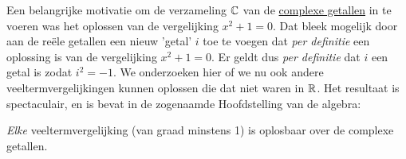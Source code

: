 \documentclass{ximera}
\begin{document}
	\author{Zomercursus KU Leuven}
	
	\label{xim:complexe_getallen_vergelijkingen}
    
Een belangrijke motivatie om de verzameling $\mathbb{C}$ van de \hyperref[xim:complexe_getallen]{complexe getallen} in te voeren was het oplossen van de vergelijking $x^2+1=0$. Dat bleek mogelijk door aan de reële getallen een nieuw 'getal' $i$ toe te voegen dat \textit{per definitie} een oplossing is van de vergelijking $x^2+1=0$. Er geldt dus \textit{per definitie} dat $i$ een getal is zodat  $i^2=-1$. We onderzoeken hier of we nu ook andere veeltermvergelijkingen kunnen oplossen die dat niet waren in $\mathbb{R}$. Het resultaat is spectaculair, en is bevat in de zogenaamde Hoofdstelling van de algebra:

\begin{theorem}\nl
\textit{Elke} veeltermvergelijking (van graad minstens 1) is oplosbaar over de complexe getallen.
\end{theorem}
\end{document}
